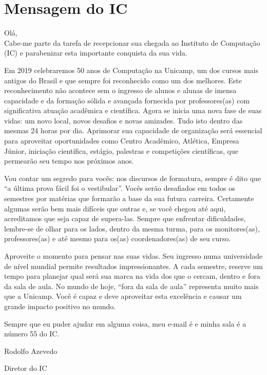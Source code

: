 
\section{Mensagem do IC}

Olá,\\

Cabe-me parte da tarefa de recepcionar sua chegada ao Instituto de Computação
(IC) e parabenizar esta importante conquista da sua vida.

Em 2019 celebraremos 50 anos de Computação na Unicamp, um dos cursos mais
antigos do Brasil e que sempre foi reconhecido como um dos melhores. Este
reconhecimento não acontece sem o ingresso de alunos e alunas de imensa
capacidade e da formação sólida e avançada fornecida por professores(as) com
significativa atuação acadêmica e científica. Agora se inicia uma nova fase de
suas vidas: um novo local, novos desafios e novas amizades. Tudo isto dentro
das mesmas 24 horas por dia. Aprimorar sua capacidade de organização será
essencial para aproveitar oportunidades como Centro Acadêmico, Atlética,
Empresa Júnior, iniciação científica, estágio, palestras e competições
científicas, que permearão seu tempo nos próximos anos.

Vou contar um segredo para vocês: nos discursos de formatura, sempre é dito que
“a última prova fácil foi o vestibular”. Vocês serão desafiados em todos os
semestres por matérias que formarão a base da sua futura carreira. Certamente
algumas serão bem mais difíceis que outras e, se você chegou até aqui,
acreditamos que seja capaz de supera-las. Sempre que enfrentar dificuldades,
lembre-se de olhar para os lados, dentro da mesma turma, para os monitores(as),
professores(as) e até mesmo para os(as) coordenadores(as) de seu curso.

Aproveite o momento para pensar nas suas vidas. Seu ingresso numa universidade
de nível mundial permite resultados impressionantes. A cada semestre, reserve
um tempo para planejar qual será sua marca na vida dos que o cercam, dentro e
fora da sala de aula. No mundo de hoje, “fora da sala de aula” representa muito
mais que a Unicamp. Você é capaz e deve aproveitar esta excelência e causar um
grande impacto positivo no mundo.

Sempre que eu puder ajudar em alguma coisa, meu e-mail é
 e minha sala é a número 55 do IC.\\


\begin{flushright}
Rodolfo Azevedo

Diretor do IC
\end{flushright}
